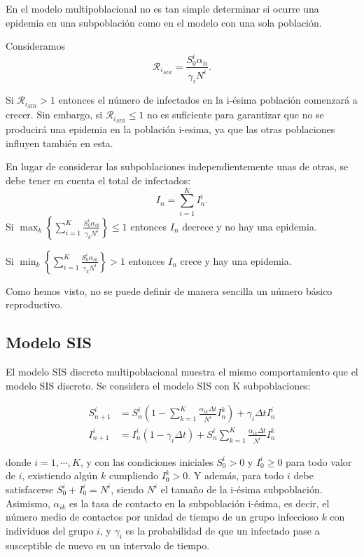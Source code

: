 En el modelo multipoblacional no es tan simple determinar si ocurre una epidemia en una subpoblación como en el modelo con una sola población.

Consideramos
$$\mathcal{R}_{i_{SIR}} = \frac{S_0^i\alpha_{ii}}{\gamma_i N^i}.$$

Si $\mathcal{R}_{i_{SIR}}>1$ entonces el número de infectados en la i-ésima población comenzará a crecer. Sin embargo, si $\mathcal{R}_{i_{SIR}} \leq 1$ no es suficiente para garantizar que no se producirá una epidemia en la población i-esima, ya que las otras poblaciones influyen también en esta.

En lugar de considerar las subpoblaciones independientemente unas de otras, se debe tener en cuenta el total de infectados:
$$I_n = \sum_{i=1}^{K}I_n^i.$$
Si $\max_{k} \left\{ \sum_{i=1}^{K}\frac{S_0^i\alpha_{ik}}{\gamma_kN^i} \right\}\leq 1$ entonces $I_n$ decrece y no hay una epidemia.

Si $\min_{k} \left\{ \sum_{i=1}^{K}\frac{S_0^i\alpha_{ik}}{\gamma_kN^i} \right\}> 1$ entonces $I_n$ crece y hay una epidemia.

Como hemos visto, no se puede definir de manera sencilla un número básico reproductivo.



\subsection{Modelo SIS}

El modelo SIS discreto multipoblacional muestra el mismo comportamiento que el modelo SIS discreto. Se considera el modelo SIS con K subpoblaciones:

\begin{equation}
\label{eqn: SIS multipoblational}
\begin{aligned}
S_{n+1}^i &= S_n^i \left( 1- \sum_{k=1}^{K} \frac{\alpha_{ik}\Delta t}{N^i}I_n^k \right) +\gamma_i \Delta t I_n^i\\
I_{n+1}^i &= I_n^i (1-\gamma_i\Delta t) + S_n^i\sum_{k=1}^{K}\frac{\alpha_{ik}\Delta t}{N^i}I_n^k 
\end {aligned}
\end{equation}

donde $i=1, \cdots , K$, y con las condiciones iniciales $S_0^i > 0$ y $I_0^i\geq 0$ para todo valor de $i$, existiendo algún $k$ cumpliendo $I_0^k>0$. Y además, para todo $i$ debe satisfacerse $S_0^i+I_0^i=N^i$, siendo $N^i$ el tamaño de la i-ésima subpoblación. Asimismo, $\alpha_{ik}$ es la tasa de contacto en la subpoblación i-ésima, es decir, el número medio de contactos por unidad de tiempo de un grupo infeccioso $k$ con individuos del grupo $i$, y $\gamma_i$ es la probabilidad de que un infectado pase a susceptible de nuevo en un intervalo de tiempo.

